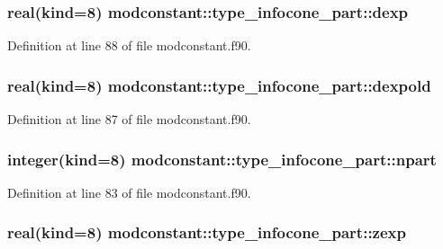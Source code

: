 \hypertarget{structmodconstant_1_1type__infocone__part_a0395444224fda81aaed35febb5cc9d82}{
\subsubsection[{dexp}]{\setlength{\rightskip}{0pt plus 5cm}real(kind=8) modconstant\-::type\-\_\-infocone\-\_\-part\-::dexp}}\label{structmodconstant_1_1type__infocone__part_a0395444224fda81aaed35febb5cc9d82}


Definition at line 88 of file modconstant.\-f90.

\hypertarget{structmodconstant_1_1type__infocone__part_af5a8f128638e0474edb01932dfd4dec7}{
\subsubsection[{dexpold}]{\setlength{\rightskip}{0pt plus 5cm}real(kind=8) modconstant\-::type\-\_\-infocone\-\_\-part\-::dexpold}}\label{structmodconstant_1_1type__infocone__part_af5a8f128638e0474edb01932dfd4dec7}


Definition at line 87 of file modconstant.\-f90.

\hypertarget{structmodconstant_1_1type__infocone__part_a7316d0f4db343f9dc87c45f241642f4f}{
\subsubsection[{npart}]{\setlength{\rightskip}{0pt plus 5cm}integer(kind=8) modconstant\-::type\-\_\-infocone\-\_\-part\-::npart}}\label{structmodconstant_1_1type__infocone__part_a7316d0f4db343f9dc87c45f241642f4f}


Definition at line 83 of file modconstant.\-f90.

\hypertarget{structmodconstant_1_1type__infocone__part_adef877fd872e2e87bfbb3973af57aae1}{
\subsubsection[{zexp}]{\setlength{\rightskip}{0pt plus 5cm}real(kind=8) modconstant\-::type\-\_\-infocone\-\_\-part\-::zexp}}\label{structmodconstant_1_1type__infocone__part_adef877fd872e2e87bfbb3973af57aae1}


